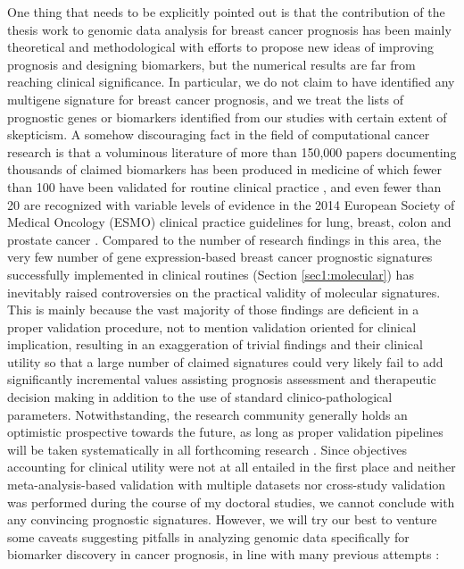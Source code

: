 One thing that needs to be explicitly pointed out is that the contribution of the thesis work to genomic data analysis for breast cancer prognosis has been mainly theoretical and methodological with efforts to propose new ideas of improving prognosis and designing biomarkers, but the numerical results are far from reaching clinical significance. In particular, we do not claim to have identified any multigene signature for breast cancer prognosis, and we treat the lists of prognostic genes or biomarkers identified from our studies with certain extent of skepticism. A somehow discouraging fact in the field of computational cancer research is that a voluminous literature of more than 150,000 papers documenting thousands of claimed biomarkers has been produced in medicine of which fewer than 100 have been validated for routine clinical practice \cite{Poste2011Bring}, and even fewer than 20 are recognized with variable levels of evidence in the 2014 European Society of Medical Oncology (ESMO) clinical practice guidelines for lung, breast, colon and prostate cancer \cite{Schneider2015Establishing}. Compared to the number of research findings in this area, the very few number of gene expression-based breast cancer prognostic signatures successfully implemented in clinical routines (Section \ref{sec1:molecular}) has inevitably raised controversies on the practical validity of molecular signatures. This is mainly because the vast majority of those findings are deficient in a proper validation procedure, not to mention validation oriented for clinical implication, resulting in an exaggeration of trivial findings and their clinical utility so that a large number of claimed signatures could very likely fail to add significantly incremental values assisting prognosis assessment and therapeutic decision making in addition to the use of standard clinico-pathological parameters. Notwithstanding, the research community generally holds an optimistic prospective towards the future, as long as proper validation pipelines will be taken systematically in all forthcoming research \cite{Michiels2016Statistical}. Since objectives accounting for clinical utility were not at all entailed in the first place and neither meta-analysis-based validation with multiple datasets nor cross-study validation was performed during the course of my doctoral studies, we cannot conclude with any convincing prognostic signatures. However, we will try our best to venture some caveats suggesting pitfalls in analyzing genomic data specifically for biomarker discovery in cancer prognosis, in line with many previous attempts \cite{Ambroise2002Selection, Simon2003Pitfalls, Issaq2011Cancer, Weigelt2012Challenges}:


